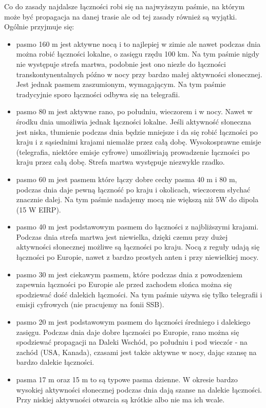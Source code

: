 \documentclass[a4paper,12pt]{article}
\begin{document}
Co do zasady najdalsze łączności robi się na najwyższym paśmie, na którym może być propagacja na danej trasie ale od tej zasady również są wyjątki. Ogólnie przyjmuje się:
\begin{itemize}
 \item pasmo 160 m jest aktywne nocą i to najlepiej w zimie ale nawet podczas dnia można robić łączności lokalne, o zasięgu rzędu 100 km. Na tym paśmie nigdy nie występuje strefa martwa, podobnie jest ono niezłe do łączności transkontynentalnych późno w nocy przy bardzo małej aktywności słonecznej. Jest jednak pasmem zaszumionym, wymagającym. Na tym paśmie tradycyjnie sporo łączności odbywa się na telegrafii.
 \item pasmo 80 m jest aktywne rano, po południu, wieczorem i w nocy. Nawet w środku dnia umożliwia jednak łączności lokalne. Jeśli aktywność słoneczna jest niska, tłumienie podczas dnia będzie mniejsze i da się robić łączności po kraju i z sąsiednimi krajami niemalże przez całą dobę. Wysokosprawne emisje (telegrafia, niektóre emisje cyfrowe) umożliwiają prowadzenie łączności po kraju przez całą dobę. Strefa martwa występuje niezwykle rzadko.
\item pasmo 60 m jest pasmem które łączy dobre cechy pasma 40 m i 80 m, podczas dnia daje pewną łączność po kraju i okolicach, wieczorem słychać znacznie dalej. Na tym paśmie nadajemy mocą nie większą niż 5W do dipola (15 W EIRP).
\item pasmo 40 m jest podstawowym pasmem do łączności z najbliższymi krajami. Podczas dnia strefa martwa jest niewielka, dzięki czemu przy dużej aktywności słonecznej możliwe są łączności po kraju. Nocą z reguły udają się łączności po Europie, nawet z bardzo prostych anten i przy niewielkiej mocy.
 \item pasmo 30 m jest ciekawym pasmem, które podczas dnia z powodzeniem zapewnia łączności po Europie ale przed zachodem słońca można się spodziewać dość dalekich łączności. Na tym paśmie używa się tylko telegrafii i emisji cyfrowych (nie pracujemy na fonii SSB).
 \item pasmo 20 m jest podstawowym pasmem do łączności średniego i dalekiego zasięgu. Podczas dnia daje dobre łączności po Europie, rano można się spodziewać propagacji na Daleki Wschód, po południu i pod wieczór - na zachód (USA, Kanada), czasami jest także aktywne w nocy, dając szansę na bardzo dalekie łączności.
 \item pasma 17 m oraz 15 m to są typowe pasma dzienne. W okresie bardzo wysokiej aktywności słonecznej podczas dnia dają szanse na dalekie łączności. Przy niskiej aktywności otwarcia są krótkie albo nie ma ich wcale.

\end{itemize}
\end{document}
